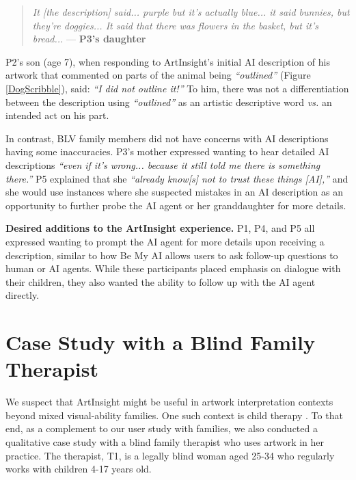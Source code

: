 \documentclass[sigconf]{acmart}
\begin{document}
\begin{quote}
    \textit{It [the description] said... purple but it's actually blue... it said bunnies, but they're doggies... It said that there was flowers in the basket, but it's bread...} --- \textbf{P3's daughter}
\end{quote}

P2's son (age 7), when responding to ArtInsight's initial AI description of his artwork that commented on parts of the animal being \textit{``outlined''} (Figure \ref{DogScribble}), said: \textit{``I did not outline it!''} To him, there was not a differentiation between the description using \textit{``outlined''} as an artistic descriptive word \textit{vs.} an intended act on his part.

In contrast, BLV family members did not have concerns with AI descriptions having some inaccuracies. P3's mother expressed wanting to hear detailed AI descriptions \textit{``even if it's wrong... because it still told me there is something there.''} P5 explained that she \textit{``already know[s] not to trust these things [AI],''} and she would use instances where she suspected mistakes in an AI description as an opportunity to further probe the AI agent or her granddaughter for more details.

\textbf{Desired additions to the ArtInsight experience.}
P1, P4, and P5 all expressed wanting to prompt the AI agent for more details upon receiving a description, similar to how Be My AI allows users to ask follow-up questions to human or AI agents. While these participants placed emphasis on dialogue with their children, they also wanted the ability to follow up with the AI agent directly.

\section{Case Study with a Blind Family Therapist}
We suspect that ArtInsight might be useful in artwork interpretation contexts beyond mixed visual-ability families. One such context is child therapy \cite{Bosgraaf2020}. To that end, as a complement to our user study with families, we also conducted a qualitative case study with a blind family therapist who uses artwork in her practice. The therapist, T1, is a legally blind woman aged 25-34 who regularly works with children 4-17 years old.
\end{document}
